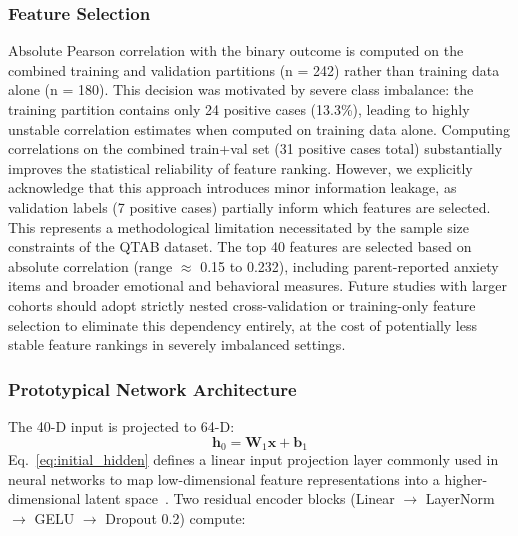 \documentclass[10pt,letterpaper]{article}
\begin{document}
                                                                         \subsubsection*{\textbf{Feature Selection}}
                                                                         Absolute Pearson correlation with the binary outcome is computed on the combined training and validation partitions (n = 242) rather than training data alone (n = 180). This decision was motivated by severe class imbalance: the training partition contains only 24 positive cases (13.3\%), leading to highly unstable correlation estimates when computed on training data alone. Computing correlations on the combined train+val set (31 positive cases total) substantially improves the statistical reliability of feature ranking. However, we explicitly acknowledge that this approach introduces minor information leakage, as validation labels (7 positive cases) partially inform which features are selected. This represents a methodological limitation necessitated by the sample size constraints of the QTAB dataset. The top 40 features are selected based on absolute correlation (range $\approx$ 0.15 to 0.232), including parent-reported anxiety items and broader emotional and behavioral measures. Future studies with larger cohorts should adopt strictly nested cross-validation or training-only feature selection to eliminate this dependency entirely, at the cost of potentially less stable feature rankings in severely imbalanced settings.

                                                                         \subsubsection*{\textbf{Prototypical Network Architecture}}
                                                                         The 40-D input is projected to 64-D:
                                                                         \begin{equation}
\mathbf{h}_0 = \mathbf{W}_1 \mathbf{x} + \mathbf{b}_1
\label{eq:initial_hidden}
\end{equation}
                                                                         Eq.~\eqref{eq:initial_hidden} defines a linear input projection layer commonly used in neural networks to map low-dimensional feature representations into a higher-dimensional latent space~\cite{ref49}. Two residual encoder blocks (Linear $\rightarrow$ LayerNorm $\rightarrow$ GELU $\rightarrow$ Dropout 0.2) compute:
\end{document}

